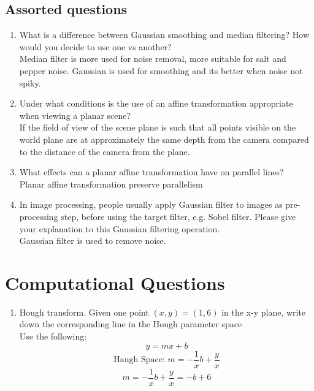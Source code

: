 \documentclass[12pt,letterpaper]{article}
\begin{document}
\subsection{Assorted questions} 
\begin{enumerate}
    \item What is a difference between Gaussian smoothing and median filtering?
    How would you decide to use one vs another? \\
    \color{red}
    Median filter is more used for noise removal, more suitable for salt and pepper noise.
    Gaussian is used for smoothing and its better when noise not spiky. 
    \color{black}
    \item Under what conditions is the use of an affine transformation appropriate
    when viewing a planar scene?\\
    \color{red}
    If the field of view of the scene plane is such that all points visible on the world plane are at 
    approximately the same depth from the camera compared to the distance of the camera from the plane.
    \color{black}
    \item What effects can a planar affine transformation have on parallel lines?
    \\
    \color{red}
    Planar affine transformation preserve parallelism
    \color{black}
    \item In image processing, people usually apply Gaussian filter to images as pre-
processing step, before using the target filter, e.g. Sobel filter. Please give your
explanation to this Gaussian filtering operation. \\
\color{red}
        Gaussian filter is used to remove noise. 
\color{black}
\end{enumerate}
\section{Computational Questions}

\begin{enumerate}
    \item Hough transform. Given one point $(x,y) = (1,6)$ in the x-y plane, write down the corresponding line in the Hough 
    parameter space\\
    \color{red}
    Use the following: 
    $$y = mx + b$$
    $$\text{Haugh Space: } m = -\frac{1}{x}b + \frac{y}{x}$$
    $$m = -\frac{1}{x}b + \frac{y}{x} = -b + 6$$
    \color{black}
\end{enumerate}
\end{document}
